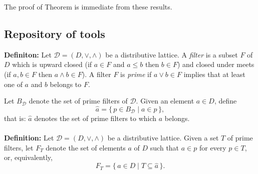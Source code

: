 \documentclass[12pt]{article}
\begin{document}
The proof of Theorem is immediate from these results.
\subsection{Repository of tools}

\textbf{Definiton:} Let $\mathcal{D} = (D, \vee, \wedge)$ be a distributive lattice. 
A \emph{filter} is a subset $F$ of $D$ which is upward closed 
(if $a \in F$ and $a \leq b$ then $b \in F$) and closed under meets 
(if $a, b \in F$ then $a \wedge b \in F$). 
A filter $F$ is \emph{prime} if $a \vee b \in F$ implies that at least one 
of $a$ and $b$ belongs to $F$. 

Let $B_{\mathcal{D}}$ denote the set of prime filters of $\mathcal{D}$.  
Given an element $a \in D$, define
\[
\hat{a} = \{\, p \in B_{\mathcal{D}} \mid a \in p \,\},
\]
that is: $\hat{a}$ denotes the set of prime filters to which $a$ belongs. \\ \\
\textbf{Definition:}
Let $\mathcal{D} = (D, \vee, \wedge)$ be a distributive lattice. 
Given a set $T$ of prime filters, let $F_T$ denote the set of elements 
$a$ of $D$ such that $a \in p$ for every $p \in T$, or, equivalently,
\[
   F_T = \{\, a \in D \mid T \subseteq \hat{a} \,\}.
\]
\end{document}
